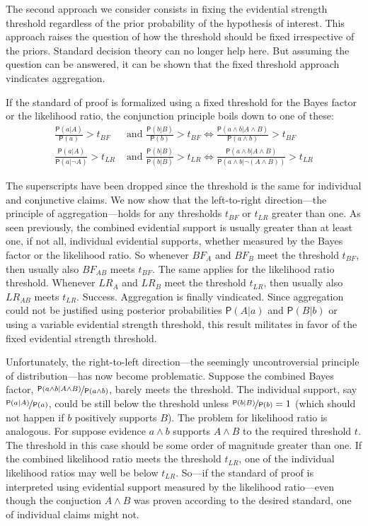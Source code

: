 \documentclass[
  10pt,
  dvipsnames,enabledeprecatedfontcommands]{scrartcl}
\newcommand{\n}{\neg}
\newcommand{\et}{\wedge}
\newcommand{\pr}[1]{\ensuremath{\mathsf{P}(#1)}}
\begin{document}
The second approach we consider consists in fixing the evidential
strength threshold regardless of the prior probability of the hypothesis
of interest. This approach raises the question of how the threshold
should be fixed irrespective of the priors. Standard decision theory can
no longer help here. But assuming the question can be answered, it can
be shown that the fixed threshold approach vindicates aggregation.

If the standard of proof is formalized using a fixed threshold for the
Bayes factor or the likelihood ratio, the conjunction principle boils
down to one of these:
\begin{align*} \frac{\pr{a \vert A }}{\pr{a}}>t_{BF} &\mbox{ and } 
\frac{\pr{ b \vert B}}{\pr{b}}>t_{BF} \Leftrightarrow 
\frac{\pr{a \et b \vert A \et B}}{\pr{a \et b}}>t_{BF} \\
 \frac{\pr{a \vert A }}{\pr{a \vert \n A}}>t_{LR} &\mbox{ and } 
\frac{\pr{ b \vert B}}{\pr{b\vert B}}>t_{LR} \Leftrightarrow 
\frac{\pr{a \et b \vert A \et B}}{\pr{a \et b\vert \n (A \et B)}}>t_{LR}
\end{align*}

\noindent The superscripts have been dropped since the threshold is the
same for individual and conjunctive claims. We now show that the
left-to-right direction---the principle of aggregation---holds for any
thresholds \(t_{BF}\) or \(t_{LR}\) greater than one. As seen
previously, the combined evidential support is usually greater than at
least one, if not all, individual evidential supports, whether measured
by the Bayes factor or the likelihood ratio. So whenever \(BF_A\) and
\(BF_B\) meet the threshold \(t_{BF}\), then usually also \(BF_{AB}\)
meets \(t_{BF}\). The same applies for the likelihood ratio threshold.
Whenever \(LR_A\) and \(LR_B\) meet the threshold \(t_{LR}\), then
usually also \(LR_{AB}\) meets \(t_{LR}\). Success. Aggregation is
finally vindicated. Since aggregation could not be justified using
posterior probabilities \(\pr{A \vert a}\) and \(\pr{B \vert b}\) or
using a variable evidential strength threshold, this result militates in
favor of the fixed evidential strength threshold.

Unfortunately, the right-to-left direction---the seemingly
uncontroversial principle of distribution---has now become problematic.
Suppose the combined Bayes factor,
\(\nicefrac{\pr{a \et b \vert A \et B}}{\pr{a \et b}}\), barely meets
the threshold. The individual support, say
\(\nicefrac{\pr{a \vert A}}{\pr{a}}\), could be still below the
threshold unless \(\nicefrac{\pr{b \vert B}}{\pr{b}}=1\) (which should
not happen if \(b\) positively supports \(B\)). The problem for
likelihood ratio is analogous. For suppose evidence \(a \et b\) supports
\(A \et B\) to the required threshold \(t\). The threshold in this case
should be some order of magnitude greater than one. If the combined
likelihood ratio meets the threshold \(t_{LR}\), one of the individual
likelihood ratios may well be below \(t_{LR}\). So---if the standard of
proof is interpreted using evidential support measured by the likelihood
ratio---even though the conjuction \(A \et B\) was proven according to
the desired standard, one of individual claims might not.
\end{document}
